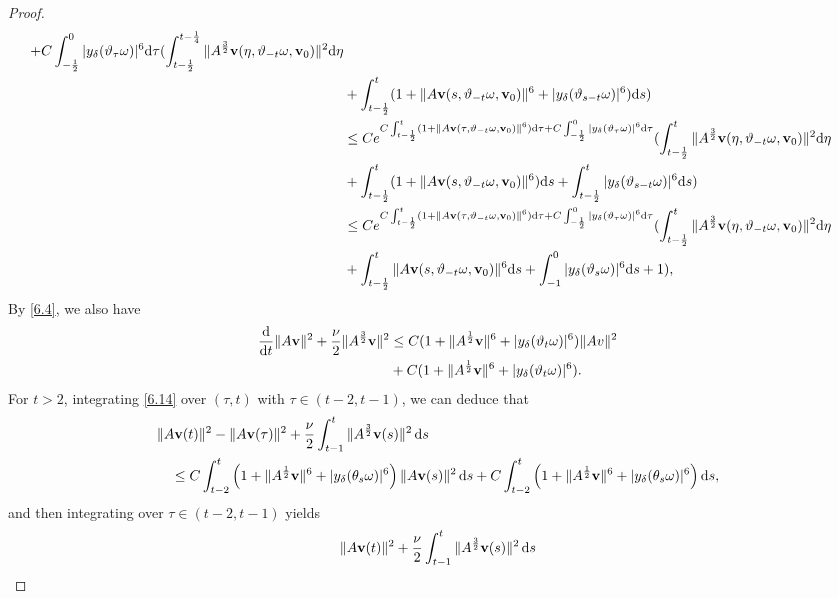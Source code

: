 \documentclass{elsarticle}
\theoremstyle{definition}
\numberwithin{equation}{section}
\renewcommand{\d}{{\rm{d}}}
\begin{document}
\begin{proof}
\begin{align}
{+C\int_{-\frac12}^0|y_\delta(\vartheta_{\tau}\omega)|^6\d\tau}
(\int_{t-\frac{1}{2}}^{t-\frac{1}{4}}\|A^\frac{3}{2}\textbf{v}(\eta,\vartheta_{-t}\omega,\textbf{v}_0)\|^2\d \eta\nonumber\\
&+\int_{t-\frac{1}{2}}^t(1+\|A\textbf{v}(s,\vartheta_{-t}\omega,\textbf{v}_0)\|^6+|y_\delta(\vartheta_{s-t}\omega)|^6)\d s)\nonumber\\
&\leq Ce^{C\int_{t-\frac12}^t(1+\|A\textbf{v}(\tau,\vartheta_{-t}\omega,\textbf{v}_0)\|^6)\d\tau
+C\int_{-\frac12}^0|y_\delta(\vartheta_{\tau}\omega)|^6\d\tau}
(\int_{t-\frac{1}{2}}^{t}\|A^\frac{3}{2}\textbf{v}(\eta,\vartheta_{-t}\omega,\textbf{v}_0)\|^2\d \eta\nonumber\\
&+\int_{t-\frac{1}{2}}^t(1+\|A\textbf{v}(s,\vartheta_{-t}\omega,\textbf{v}_0)\|^6)\d s
+\int_{t-\frac{1}{2}}^t|y_\delta(\vartheta_{s-t}\omega)|^6\d s)\nonumber\\
&\leq Ce^{C\int_{t-\frac12}^t(1+\|A\textbf{v}(\tau,\vartheta_{-t}\omega,\textbf{v}_0)\|^6)\d\tau
+C\int_{-\frac12}^0|y_\delta(\vartheta_{\tau}\omega)|^6\d\tau}
(\int_{t-\frac{1}{2}}^{t}\|A^\frac{3}{2}\textbf{v}(\eta,\vartheta_{-t}\omega,\textbf{v}_0)\|^2\d \eta\nonumber\\
&+\int_{t-\frac{1}{2}}^t\|A\textbf{v}(s,\vartheta_{-t}\omega,\textbf{v}_0)\|^6\d s
+\int_{-1}^0|y_\delta(\vartheta_{s}\omega)|^6\d s+1),
\end{align}
By \eqref{6.4}, we also have
\begin{align}\label{6.14}
\frac{\d}{\d t}\|A\textbf{v}\|^2+\frac{\nu}{2}\|A^\frac{3}{2}\textbf{v}\|^2
&\leq C(1+\|A^{\frac{1}{2}}\textbf{v}\|^6+|y_\delta(\vartheta_t\omega)|^6)\|Av\|^2\nonumber\\
&+C(1+\|A^{\frac{1}{2}}\textbf{v}\|^6+|y_\delta(\vartheta_t\omega)|^6).
\end{align}
For $t>2$, integrating \eqref{6.14} over $(\tau,t)$ with $\tau\in (t-2,t-1)$, we can deduce that
\begin{align*}
&
\|A\textbf{v} (t) \|^2 -\|A\textbf{v}(\tau) \|^2  + \frac{\nu }{2}\int^t_{t-1} \|A^\frac32 \textbf{v}(s)\|^2 \, \d s \\
&\quad
 \leq  C \int^t_{t-2} \left(1+\|A^{\frac{1}{2}}\textbf{v}\|^6+  |y_\delta(\theta_s\omega)|^6 \right) \|A\textbf{v}(s) \|^2\, \d s
+ C\int^t_{t-2} \left(1+\|A^{\frac{1}{2}}\textbf{v}\|^6 +|y_\delta(\theta_s\omega)|^6 \right )  \d s,
\end{align*}
and then integrating over $\tau\in (t-2,t-1)$ yields
\begin{align*}
\|A\textbf{v} (t) \|^2+  \frac{\nu}{2} \int^t_{t-1} \|A^{\frac32} \textbf{v}(s)\|^2\, \d s

\end{align*}
\end{proof}
\end{document}
